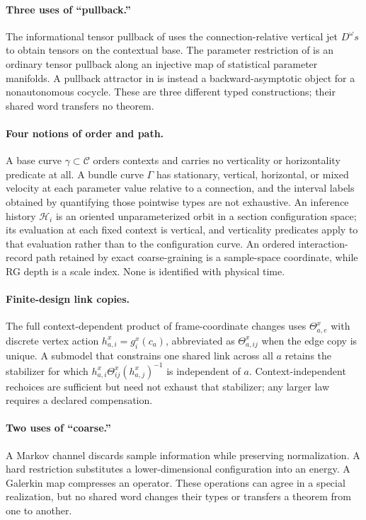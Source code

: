 \paragraph{Three uses of ``pullback.''}
The informational tensor pullback of  uses the
connection-relative vertical jet \(D^\omega s\) to obtain tensors on the
contextual base.  The parameter restriction of
 is an ordinary tensor pullback along an
injective map of statistical parameter manifolds.  A pullback attractor in
 is instead a backward-asymptotic object for a
nonautonomous cocycle.  These are three different typed constructions; their
shared word transfers no theorem.

\paragraph{Four notions of order and path.}
A base curve \(\gamma\subset\mathcal C\) orders contexts and carries no
verticality or horizontality predicate at all. A bundle curve
\(\Gamma\) has stationary, vertical, horizontal, or mixed velocity at each
parameter value relative to a connection, and the interval labels obtained by
quantifying those pointwise types are not exhaustive. An inference history
\(\mathscr H_i\) is an oriented unparameterized orbit in a section
configuration space; its evaluation at each fixed context is vertical, and
verticality predicates apply to that evaluation rather than to the
configuration curve. An ordered interaction-record path retained by exact
coarse-graining is a sample-space coordinate, while RG depth is a scale index.
None is identified with physical time.

\paragraph{Finite-design link copies.}
The full context-dependent product of frame-coordinate changes uses
\(\Theta_{a,e}^x\) with discrete vertex action
\(h_{a,i}^x=g_i^x(c_a)\), abbreviated as \(\Theta_{a,ij}^x\) when the
edge copy is unique. A submodel that constrains one shared link across all
\(a\) retains the stabilizer for which
\(h_{a,i}^x\Theta_{ij}^x(h_{a,j}^x)^{-1}\) is independent of \(a\).
Context-independent rechoices are sufficient but need not exhaust that
stabilizer; any larger law requires a declared compensation.

\paragraph{Two uses of ``coarse.''}
A Markov channel discards sample information while preserving
normalization.  A hard restriction substitutes a lower-dimensional
configuration into an energy.  A Galerkin map compresses an operator.
These operations can agree in a special realization, but no shared word
changes their types or transfers a theorem from one to another.
